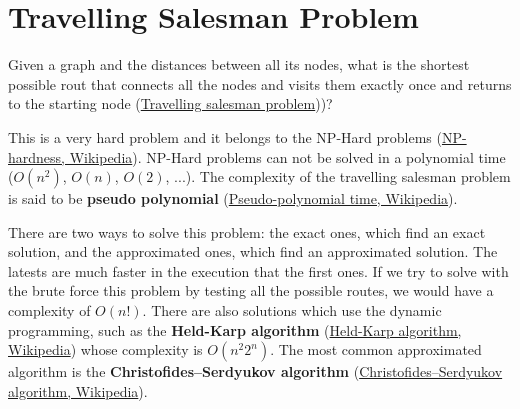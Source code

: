 \section{Travelling Salesman Problem}
Given a graph and the distances between all its nodes, what is the shortest possible rout that connects all the nodes and visits them exactly once and returns to the starting node \cite{wikitravsales} (\href{https://en.wikipedia.org/wiki/Travelling_salesman_problem}{Travelling salesman problem}))?

This is a very hard problem and it belongs to the NP-Hard problems \cite{wikihphard} (\href{https://en.wikipedia.org/wiki/NP-hardness}{NP-hardness, Wikipedia}). NP-Hard problems can not be solved in a polynomial time (\(O(n^{2})\), \(O(n)\), \(O(2)\), ...). The complexity of the travelling salesman problem is said to be \textbf{pseudo polynomial} \cite{wikipseudo} (\href{https://en.wikipedia.org/wiki/Pseudo-polynomial_time}{Pseudo-polynomial time, Wikipedia}). 

There are two ways to solve this problem: the exact ones, which find an exact solution, and the approximated ones, which find an approximated solution. The latests are much faster in the execution that the first ones. If we try to solve with the brute force this problem by testing all the possible routes, we would have a complexity of \(O(n!)\). There are also solutions which use the dynamic programming, such as the \textbf{Held-Karp algorithm} \cite{wikiheldkarp} (\href{https://en.wikipedia.org/wiki/Held–Karp_algorithm}{Held-Karp algorithm, Wikipedia}) whose complexity is \(O(n^{2}2^{n})\). The most common approximated algorithm is the \textbf{Christofides–Serdyukov algorithm} \cite{wikichristofides} (\href{https://en.wikipedia.org/wiki/Christofides_algorithm}{Christofides–Serdyukov algorithm, Wikipedia}).